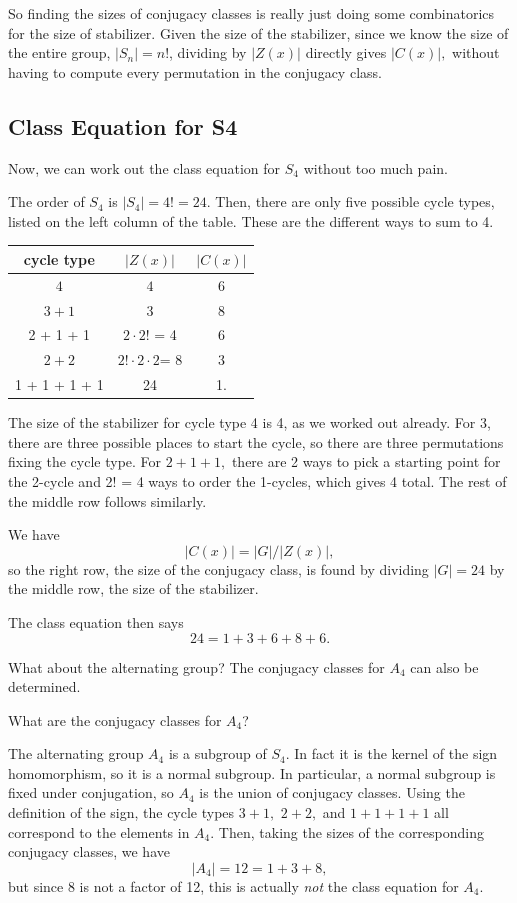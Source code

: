 So finding the sizes of conjugacy classes is really just doing some combinatorics for the size of stabilizer. Given the size of the stabilizer, since we know the size of the entire group, $|S_n| = n!$, dividing by $|Z(x)|$ directly gives $|C(x)|,$ without having to compute every permutation in the conjugacy class.

\subsection{Class Equation for S4}

Now, we can work out the class equation for $S_4$ without too much pain. 

\begin{example}
The order of $S_4$ is $|S_4| = 4! =24.$ Then, there are only five possible cycle types, listed on the left column of the table. These are the different ways to sum to 4.


\begin{center}
    \begin{tabular}{c|c|c}
        cycle type & $|Z(x)|$ & $|C(x)|$ \\
        \hline 
        $4$ &  $4$ & 6 \\
        $3 + 1 $& 3& 8\\
        2 + 1 + 1 & $2\cdot 2!$ = 4 & 6 \\
        $2 + 2$ & $2! \cdot 2 \cdot 2 $= 8 & 3\\
        1 + 1 + 1 + 1 & 24 & 1.
    \end{tabular}
\end{center}

The size of the stabilizer for cycle type 4 is 4, as we worked out already. For 3, there are three possible places to start the cycle, so there are three permutations fixing the cycle type. For $2 + 1 + 1,$ there are 2 ways to pick a starting point for the 2-cycle and 2! = 4 ways to order the 1-cycles, which gives 4 total. The rest of the middle row follows similarly. 

We have \[|C(x)| = |G|/|Z(x)|,\] so the right row, the size of the conjugacy class, is found by dividing $|G| = 24$ by the middle row, the size of the stabilizer. 

The class equation then says 
\[
\boxed{24 = 1 + 3 + 6 + 8 + 6.}
\]
\end{example}

What about the alternating group? The conjugacy classes for $A_4$ can also be determined.
\begin{example}
What are the conjugacy classes for $A_4$?
\end{example}
The alternating group $A_4$ is a subgroup of $S_4.$ In fact it is the kernel of the sign homomorphism, so it is a normal subgroup. In particular, a normal subgroup is fixed under conjugation, so $A_4$ is the union of conjugacy classes. Using the definition of the sign, the cycle types $3 + 1,$ $2 + 2,$ and $1 + 1 + 1 + 1$ all correspond to the elements in $A_4.$ Then, taking the sizes of the corresponding conjugacy classes, we have
\[
|A_4| = 12 = 1 + 3 + 8,
\]
but since 8 is not a factor of 12, this is actually \emph{not} the class equation for $A_4.$ 

